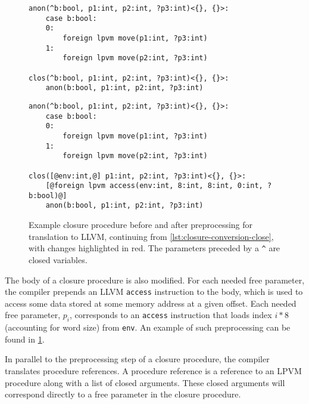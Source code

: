 \begin{figure}[ht]
  \begin{minipage}[t]{\textwidth}
    \begin{lstlisting}
anon(^b:bool, p1:int, p2:int, ?p3:int)<{}, {}>:
    case b:bool:
    0:
        foreign lpvm move(p1:int, ?p3:int) 
    1:
        foreign lpvm move(p2:int, ?p3:int) 
  
clos(^b:bool, p1:int, p2:int, ?p3:int)<{}, {}>:
    anon(b:bool, p1:int, p2:int, ?p3:int)
\end{lstlisting}
  \end{minipage}
  \begin{minipage}[t]{\textwidth}
    \begin{lstlisting}
anon(^b:bool, p1:int, p2:int, ?p3:int)<{}, {}>:
    case b:bool:
    0:
        foreign lpvm move(p1:int, ?p3:int) 
    1:
        foreign lpvm move(p2:int, ?p3:int) 
        
clos([@env:int,@] p1:int, p2:int, ?p3:int)<{}, {}>:
    [@foreign lpvm access(env:int, 8:int, 8:int, 0:int, ?b:bool)@]
    anon(b:bool, p1:int, p2:int, ?p3:int)
\end{lstlisting}
  \end{minipage}
  \caption[Example closure procedure before and after preprocessing for translation to LLVM.]{Example closure procedure before and after preprocessing for translation to LLVM, continuing from \cref{lst:closure-conversion-close}, with changes highlighted in \textcolor{rred}{red}. The parameters preceded by a \texttt{\^} are closed variables. }
  \label{lst:lpvm-closure-preprocessing}
\end{figure}

The body of a closure procedure is also modified. For each needed free parameter, the compiler prepends an LLVM \texttt{access} instruction to the body, which is used to access some data stored at some memory address at a given offset. Each needed free parameter, $p_i$, corresponds to an \texttt{access} instruction that loads index $i * 8$ (accounting for word size) from \texttt{env}. An example of such preprocessing can be found in \cref{lst:lpvm-closure-preprocessing}.

In parallel to the preprocessing step of a closure procedure, the compiler translates procedure references. A procedure reference is a reference to an LPVM procedure along with a list of closed arguments. These closed arguments will correspond directly to a free parameter in the closure procedure.

